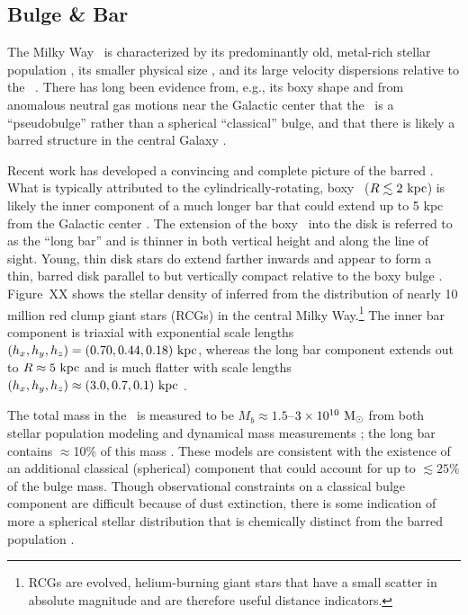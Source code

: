 \subsection{Bulge \& Bar}

The Milky Way \mwbulge\ is characterized by its predominantly old, metal-rich stellar population \citep[$t_{\rm age} \gtrsim 5~{\rm Gyr}$, ${[{\rm Fe}/{\rm H}]} \gtrsim -0.25$;][]{todo}, its smaller physical size \citep[$R \lesssim 1$--$2~\kpc$;][]{todo}, and its large velocity dispersions relative to the \mwdisk\ \citep[$\sigma_v \sim 100~\kms$;][]{todo}. There has long been evidence from, e.g., its boxy shape and from anomalous neutral gas motions near the Galactic center that the \mwbulge\ is a ``pseudobulge'' rather than a spherical ``classical'' bulge, and that there is likely a barred structure in the central Galaxy \citep{blitz91, binney91, weiland94, binney97}. 

Recent work has developed a convincing and complete picture of the barred \mwbulge. What is typically attributed to the cylindrically-rotating, boxy \mwbulge\ ($R \lesssim 2~\mathrm{kpc}$) is likely the inner component of a much longer bar that could extend up to 5 kpc from the Galactic center \citep{wegg13, wegg15}. The extension of the boxy \mwbulge\ into the disk is referred to as the ``long bar'' and is thinner in both vertical height and along the line of sight. Young, thin disk stars do extend farther inwards and appear to form a thin, barred disk parallel to but vertically compact relative to the boxy bulge \citep{dekany15}. Figure~XX shows the stellar density of  inferred from the distribution of nearly 10 million red clump giant stars (RCGs) in the central Milky Way.\footnote{RCGs are evolved, helium-burning giant stars that have a small scatter in absolute magnitude and are therefore useful distance indicators.} The inner bar component is triaxial with exponential scale lengths $(h_x, h_y, h_z) = (0.70, 0.44, 0.18)~\mathrm{kpc}$, whereas the long bar component extends out to $R\approx 5~\mathrm{kpc}$ and is much flatter with scale lengths $(h_x, h_y, h_z) \approx (3.0, 0.7, 0.1)~\mathrm{kpc}$ \citep{wegg15}. 

The total mass in the \mwbulge\ is measured to be $M_b \approx 1.5$--$3 \times 10^{10}~\mathrm{M}_\odot$ from both stellar population modeling \citep{dwek95, valenti15} and dynamical mass measurements \citep{zhao94, portail15}; the long bar contains $\approx$10\% of this mass \citep{wegg15}. These models are consistent with the existence of an additional classical (spherical) component that could account for up to $\lesssim 25\%$ of the bulge mass. Though observational constraints on a classical bulge component are difficult because of dust extinction, there is some indication of more a spherical stellar distribution that is chemically distinct from the barred population \citep{ness13a,ness13b, todo}.

